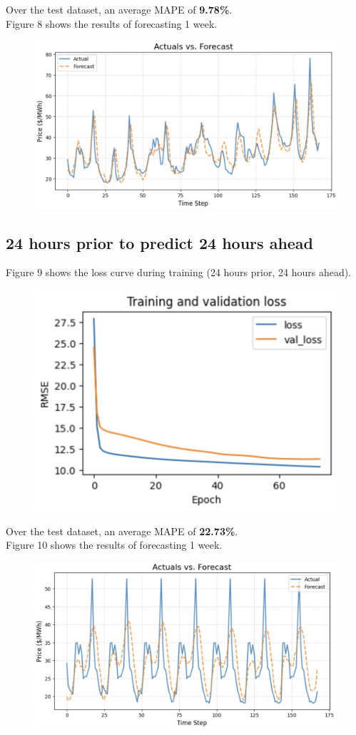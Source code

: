\documentclass[9pt,a4paper,twoside]{rho}
\begin{document}
\noindent Over the test dataset, an average MAPE of \textbf{9.78\%}.\\

\noindent Figure 8 shows the results of forecasting 1 week.
\begin{figure}[H]
	\centering
	\includegraphics[width=0.8\columnwidth]{Figures/Dense_24_1_Results.png}
\end{figure}

\subsection*{24 hours prior to predict 24 hours ahead}

\noindent Figure 9 shows the loss curve during training (24 hours prior, 24 hours ahead).
\begin{figure}[H]
	\centering
	\includegraphics[width=0.8\columnwidth]{Figures/Dense_24_24_Learning.png}
\end{figure}

\noindent Over the test dataset, an average MAPE of \textbf{22.73\%}.\\

\noindent Figure 10 shows the results of forecasting 1 week.
\begin{figure}[H]
	\centering
	\includegraphics[width=0.8\columnwidth]{Figures/Dense_24_24_Results.png}
\end{figure}
\end{document}
